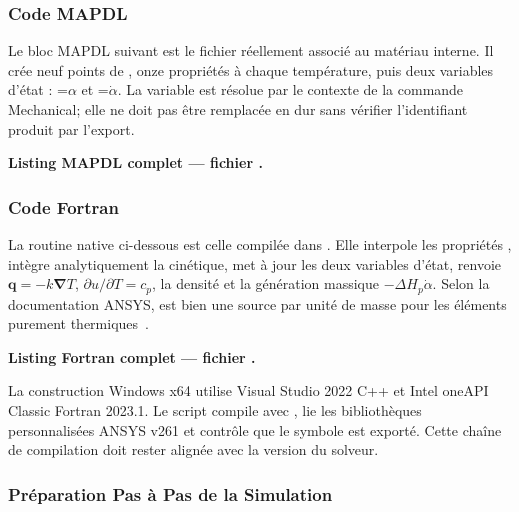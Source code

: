 \documentclass[oneside,openany]{amsdtx}
\newcommand{\pd}{\partial}
\newcommand{\vect}[1]{\bm{#1}}
\begin{document}
\subsubsection{Code MAPDL}
\label{sec:apdl-code}

Le bloc MAPDL suivant est le fichier réellement associé au matériau interne. Il
crée neuf points de , onze propriétés à chaque température, puis
deux variables d'état : =\(\alpha\) et
=\(\dot\alpha\). La variable  est résolue par le
contexte de la commande Mechanical; elle ne doit pas être remplacée en dur sans
vérifier l'identifiant produit par l'export.

\medskip
\noindent\textbf{Listing MAPDL complet --- fichier
.}


\subsubsection{Code Fortran }

La routine native ci-dessous est celle compilée dans
. Elle interpole les propriétés , intègre
analytiquement la cinétique, met à jour les deux variables d'état, renvoie
\(\vect q=-k\vect\nabla T\), \(\pd u/\pd T=c_p\), la densité et la génération
massique \(-\Delta H_p\dot\alpha\). Selon la documentation ANSYS, 
est bien une source par unité de masse pour les éléments purement
thermiques~\cite{ansys-usermatth}.

\medskip
\noindent\textbf{Listing Fortran complet --- fichier .}


La construction Windows x64 utilise Visual Studio 2022 C++ et Intel oneAPI
Classic Fortran 2023.1. Le script  compile avec
, lie les bibliothèques personnalisées ANSYS v261 et contrôle que
le symbole  est exporté. Cette chaîne de compilation doit rester
alignée avec la version du solveur.

\subsubsection{Préparation Pas à Pas de la Simulation}
\end{document}
